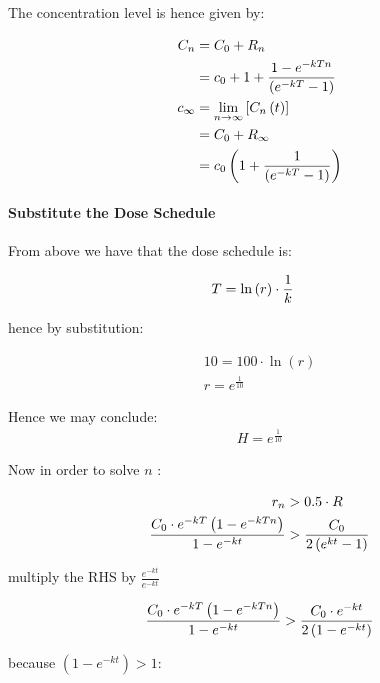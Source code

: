 The concentration level is hence given by:

\begin{align}
C_n &= C_0+R_n \notag \\
&= c_0 +   1 + \frac{1 - e^{- kTn}}{\left( e^{- kT} - 1 \right)}  \notag\\
c_\infty &= \lim_{n     \rightarrow \infty}\left[ C_n\left( t \right) \right] \notag\\
&= C_0 + R_\infty \notag\\
&= c_0\left( 1 + \frac{1}{\left( e^{- kT} - 1 \right)} \right) \notag\\
\end{align}


\paragraph{Substitute the Dose Schedule}
From above we have that the dose schedule is:

\begin{align}
T&= \ln{ \left( r \right) }\cdot  \frac{1}{k} \notag
\end{align}

hence by substitution:

\begin{align*}
  10 = 100\cdot  \ln{ \left( r \right) } \\
  r= e^{\frac{1}{10}}
\end{align*}

Hence we may conclude:
\begin{align}
  H= e^{\frac{1}{10}}
\end{align}

Now in order to solve $n$ :


\begin{align*}
  r_n &> 0.5\cdot  R \\
  \frac{C_0 \cdot  e^{- kT}\left( 1- e^{- kTn} \right)}{1- e^{- kt}} &> \frac{C_0}{2\left( e^{kt} - 1 \right)}  \notag \\ 
\end{align*}

multiply the RHS by $\frac{e^{- kt}}{e^{- kt}}$

\begin{align}
  \frac{C_0 \cdot  e^{- kT}\left( 1- e^{- kTn} \right)}{1- e^{- kt}} &> \frac{C_0\cdot  e^{- kt}}{2\left(1- e^{-kt}  \right)}  \notag \\ 
\end{align}

because $\left( 1- e^{- kt} \right)>1$:

